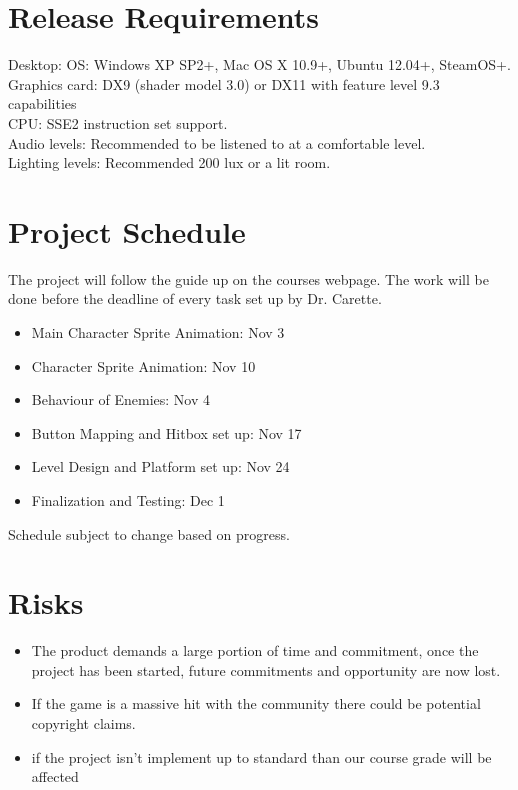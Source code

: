 \documentclass{article}
\begin{document}
	\section{Release Requirements}
	Desktop: OS: Windows XP SP2+, Mac OS X 10.9+, Ubuntu 12.04+, SteamOS+. \\
	Graphics card: DX9 (shader model 3.0) or DX11 with feature level 9.3 capabilities\\
	CPU: SSE2 instruction set support. \\
	Audio levels: Recommended to be listened to at a comfortable level. \\
	Lighting levels: Recommended 200 lux or a lit room.

	\section{Project Schedule}
	The project will follow the guide up on the courses webpage. The work will be done before the deadline of every task set up by Dr. Carette.\\
	\begin{itemize}
		\item Main Character Sprite Animation: Nov 3
		\item Character Sprite Animation: Nov 10
		\item Behaviour of Enemies: Nov 4
		\item Button Mapping and Hitbox set up: Nov 17
		\item Level Design and Platform set up: Nov 24
		\item Finalization and Testing: Dec 1
	\end{itemize}
	Schedule subject to change based on progress.

	\section{Risks}
	\begin{itemize}
		\item The product demands a large portion of time and commitment, once the project has been started, future commitments and opportunity are now lost.
		\item If the game is a massive hit with the community  there could be potential copyright claims.
		\item if the project isn’t implement up to standard than our course grade will be affected
	\end{itemize}
\end{document}
